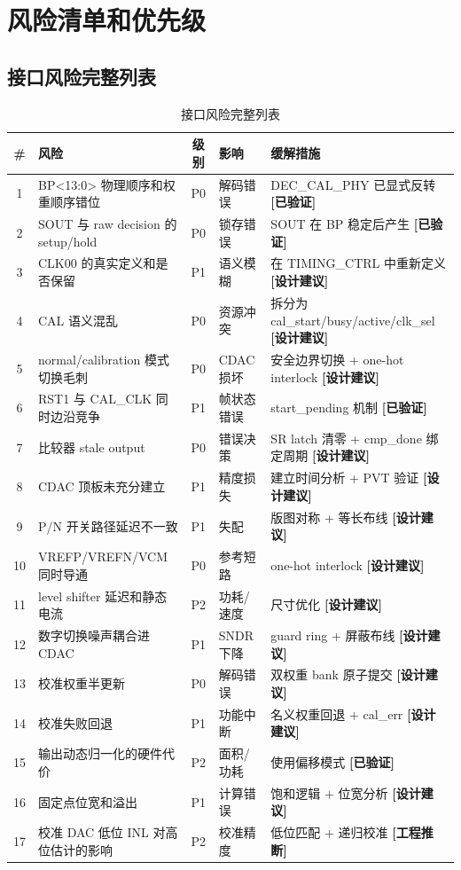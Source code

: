 \documentclass[UTF8,a4paper,11pt]{ctexart}
\newcommand{\verified}{\textcolor{verifiedgreen}{\textbf{[已验证]}}}
\newcommand{\inferred}{\textcolor{inferorange}{\textbf{[工程推断]}}}
\newcommand{\suggested}{\textcolor{suggestblue}{\textbf{[设计建议]}}}
\begin{document}
\section{风险清单和优先级}

\subsection{接口风险完整列表}

\begin{table}[H]
\centering
\caption{接口风险完整列表}
\label{tab:risk-list}
\scriptsize
\begin{tabular}{cp{3cm}cp{2.5cm}p{4cm}}
\toprule
\# & 风险 & 级别 & 影响 & 缓解措施 \\
\midrule
1  & BP<13:0> 物理顺序和权重顺序错位 & P0 & 解码错误 & DEC\_CAL\_PHY 已显式反转 \verified \\
2  & SOUT 与 raw decision 的 setup/hold & P0 & 锁存错误 & SOUT 在 BP 稳定后产生 \verified \\
3  & CLK00 的真实定义和是否保留 & P1 & 语义模糊 & 在 TIMING\_CTRL 中重新定义 \suggested \\
4  & CAL 语义混乱 & P0 & 资源冲突 & 拆分为 cal\_start/busy/active/clk\_sel \suggested \\
5  & normal/calibration 模式切换毛刺 & P0 & CDAC 损坏 & 安全边界切换 + one-hot interlock \suggested \\
6  & RST1 与 CAL\_CLK 同时边沿竞争 & P1 & 帧状态错误 & start\_pending 机制 \verified \\
7  & 比较器 stale output & P0 & 错误决策 & SR latch 清零 + cmp\_done 绑定周期 \suggested \\
8  & CDAC 顶板未充分建立 & P1 & 精度损失 & 建立时间分析 + PVT 验证 \suggested \\
9  & P/N 开关路径延迟不一致 & P1 & 失配 & 版图对称 + 等长布线 \suggested \\
10 & VREFP/VREFN/VCM 同时导通 & P0 & 参考短路 & one-hot interlock \suggested \\
11 & level shifter 延迟和静态电流 & P2 & 功耗/速度 & 尺寸优化 \suggested \\
12 & 数字切换噪声耦合进 CDAC & P1 & SNDR 下降 & guard ring + 屏蔽布线 \suggested \\
13 & 校准权重半更新 & P0 & 解码错误 & 双权重 bank 原子提交 \suggested \\
14 & 校准失败回退 & P1 & 功能中断 & 名义权重回退 + cal\_err \suggested \\
15 & 输出动态归一化的硬件代价 & P2 & 面积/功耗 & 使用偏移模式 \verified \\
16 & 固定点位宽和溢出 & P1 & 计算错误 & 饱和逻辑 + 位宽分析 \suggested \\
17 & 校准 DAC 低位 INL 对高位估计的影响 & P2 & 校准精度 & 低位匹配 + 递归校准 \inferred \\
\bottomrule
\end{tabular}
\end{table}
\end{document}
